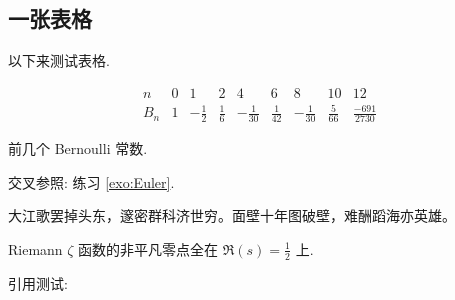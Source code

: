 	\subsection{一张表格}
	以下来测试表格.

	\begin{table}[h!]
		\begin{equation*}\begin{array}{c|cccccccc}
			n & 0 & 1 & 2 & 4 & 6 & 8 & 10 & 12 \\ \hline
			B_n & 1 & -\frac{1}{2} & \frac{1}{6} & -\frac{1}{30} & \frac{1}{42} & -\frac{1}{30} & \frac{5}{66} & \frac{-691}{2730}
		\end{array}\end{equation*}
		\caption{前几个 Bernoulli 常数.}
		\label{table:B}
	\end{table}
	交叉参照: 练习 \ref{exo:Euler}.

	\begin{conjecture}[周恩来, 1917]
		大江歌罢掉头东，邃密群科济世穷。面壁十年图破壁，难酬蹈海亦英雄。
	\end{conjecture}

	\begin{hypothesis}
		Riemann $\zeta$ 函数的非平凡零点全在 $\Re(s) = \frac{1}{2}$ 上.
	\end{hypothesis}

	引用测试: \cite{Oxl11, ZG}